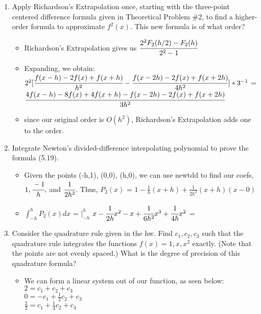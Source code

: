 \documentclass[12pt]{article}
\begin{document}
\begin{enumerate}
	\item Apply Richardson’s Extrapolation once, starting with the three-point centered difference formula given in Theoretical Problem $\#$2, to find a higher-order formula to approximate $f^2(x)$. This new formula is of what order?
	\begin{itemize}
		\item Richardson's Extrapolation gives us $\cfrac{2^2F_2(h/2)-F_2(h)}{2^2-1}$
		\item Expanding, we obtain: \\
		 $2^2[\cfrac{f(x-h) - 2f(x) + f(x+h)}{h^2} - \cfrac{f(x-2h) - 2f(x) + f(x+2h)}{4h^2}] * 3^{-1}$ =  \\
		 $\cfrac{4f(x-h) - 8f(x) + 4f(x+h) - f(x-2h) - 2f(x) + f(x+2h)}{3h^2}$
		 \item {} since our original order is $O(h^2)$, Richardson's Extrapolation adds one to the order.
	\end{itemize}	
	
	
	\item Integrate Newton's divided-difference interpolating polynomial to prove the formula (5.19).
	\begin{itemize}
		\item Given the points (-h,1), (0,0), (h,0), we can use newtdd to find our coefs, $1, \cfrac{-1}{h}, $ and $\cfrac{1}{2h^2}$. Thus, $P_2(x)$ = $1 - \frac{1}{h}(x+h)+\frac{1}{2h^2}(x+h)(x-0)$
		\item $\int_{-h}^h P_2(x)dx$ = $|_{-h}^h$ $x-\cfrac{1}{2h}x^2-x+\cfrac{1}{6h^2}x^3+\cfrac{1}{4h}x^2$ = 
	\end{itemize}
	
	\item Consider the quadrature rule given in the hw. Find $c_1, c_2, c_3$ such that the quadrature rule integrates the functions $f(x) = 1, x, x^2$ exactly. (Note that the points are not evenly spaced.) What is the degree of precision of this quadrature formula?
	\begin{itemize}
		\item We can form a linear system out of our function, as seen below: \\
		$2 = c_1 + c_2 + c_3$ \\
		$0 = -c_1 + \frac{1}{2}c_2+c_3$ \\
		$\frac{2}{3} = c_1 + \frac{1}{4}c_2 + c_3$
		

\end{itemize}
\end{enumerate}
\end{document}
